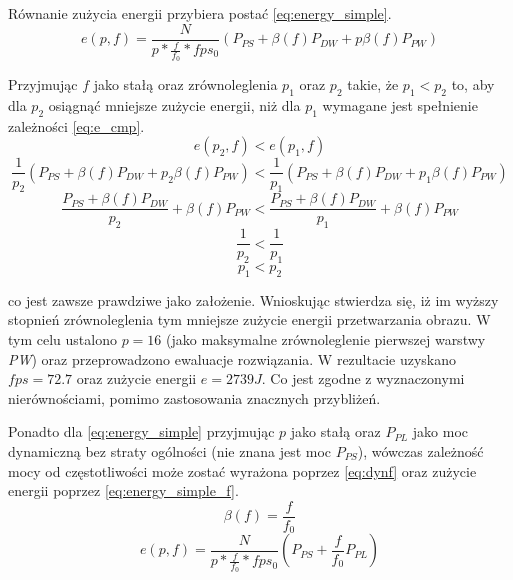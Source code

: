 Równanie zużycia energii przybiera postać \eqref{eq:energy_simple}.
\begin{equation}
e(p,f) = \frac{N}{p*\frac{f}{f_0}* fps_0}(P_{PS} + \beta (f) P_{DW} + p \beta (f) P_{PW})
\label{eq:energy_simple}
\end{equation}


Przyjmując $f$ jako stałą oraz zrównoleglenia $p_1$ oraz $p_2$ takie, że $p_1 < p_2$ 
to, aby dla $p_2$ osiągnąć mniejsze zużycie energii, niż dla $p_1$ wymagane jest spełnienie zależności \eqref{eq:e_cmp}.
\begin{equation}
e(p_2, f) < e(p_1, f)
\label{eq:e_cmp}
\end{equation}
\begin{equation}
\frac{1}{p_2}(P_{PS} + \beta(f) P_{DW} + p_2 \beta(f) P_{PW}) < 
\frac{1}{p_1}(P_{PS} + \beta(f) P_{DW} + p_1 \beta(f) P_{PW})
\end{equation}
\begin{equation}
\frac{P_{PS} + \beta(f) P_{DW}}{p_2} + \beta(f) P_{PW} < 
\frac{P_{PS} + \beta(f) P_{DW}}{p_1} + \beta(f) P_{PW}
\end{equation}
\begin{equation}
\frac{1}{p_2} < \frac{1}{p_1}
\end{equation}
\begin{equation}
p_1 < p_2
\end{equation}

 co jest zawsze prawdziwe jako założenie. 
 Wnioskując stwierdza się, iż im wyższy stopnień zrównoleglenia tym mniejsze zużycie energii przetwarzania obrazu.
 W tym celu ustalono $p = 16$ (jako maksymalne zrównoleglenie pierwszej warstwy \emph{PW}) oraz przeprowadzono ewaluacje rozwiązania.
 W rezultacie uzyskano $fps = 72.7$ oraz zużycie energii $e = 2739 J$.
 Co jest zgodne z wyznaczonymi nierównościami, pomimo zastosowania znacznych przybliżeń.
 
 Ponadto dla \eqref{eq:energy_simple} przyjmując $p$ jako stałą oraz  $P_{PL}$ jako moc dynamiczną bez straty ogólności (nie znana jest moc $P_{PS}$), wówczas zależność mocy od częstotliwości może zostać wyrażona poprzez \eqref{eq:dynf} \cite{dynamic_power} oraz zużycie energii poprzez \eqref{eq:energy_simple_f}. 
\begin{equation}
\beta(f) = \frac{f}{f_0}
\label{eq:dynf}
\end{equation} 
\begin{equation}
e(p,f) = \frac{N}{p*\frac{f}{f_0}* fps_0}(P_{PS} + \frac{f}{f_0} P_{PL})
\label{eq:energy_simple_f}
\end{equation}

